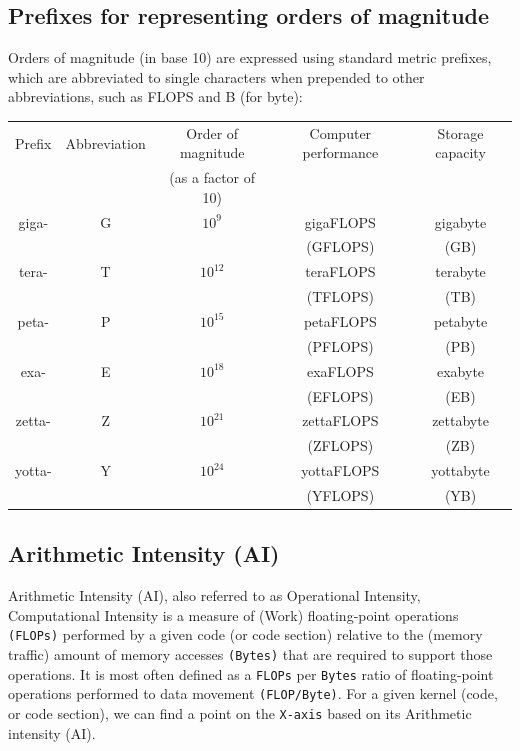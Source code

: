 \documentclass{article}
\begin{document}
\subsection{Prefixes for representing orders of magnitude}
Orders of magnitude (in base 10) are expressed using standard metric prefixes, which are abbreviated to single characters when prepended to other abbreviations, such as FLOPS and B (for byte):
\begin{table}[!htp] %
\begin{tabular}{|c|c|c|c|c|} \hline
Prefix & Abbreviation  & Order of magnitude     & Computer performance & Storage capacity \\
       &               &   (as a factor of 10)  &                      &  \\ \hline\hline
giga-  & G & $10^9$    & gigaFLOPS    & gigabyte \\
       &   &           &  (GFLOPS)    &   (GB)   \\ \hline
tera-  & T & $10^{12}$ &  teraFLOPS   & terabyte \\
       &   &           &  (TFLOPS)    &  (TB) \\ \hline
peta-  & P & $10^{15}$ & petaFLOPS    & petabyte\\
       &   &           & (PFLOPS)    & (PB) \\ \hline
exa-   & E & $10^{18}$ & exaFLOPS     & exabyte \\
       &   &           &   (EFLOPS)     & (EB) \\  \hline
zetta- & Z & $10^{21}$ & zettaFLOPS   & zettabyte \\
       &   &           & (ZFLOPS)     & (ZB) \\  \hline
yotta- & Y & $10^{24}$ & yottaFLOPS   & yottabyte \\
       &   &           & (YFLOPS)     &  (YB) \\  \hline
\end{tabular}
\end{table}
\subsection{Arithmetic Intensity (AI)}
Arithmetic Intensity (AI), also referred to as Operational Intensity, Computational Intensity is a measure of (Work) floating-point operations \verb+(FLOPs)+ performed by a given code (or code section) relative to the (memory traffic) amount of memory accesses \verb+(Bytes)+ that are required to support those operations. 
It is most often defined as a \verb+FLOPs+ per \verb+Bytes+ ratio of floating-point operations performed to data movement \verb+(FLOP/Byte)+. 
For a given kernel (code, or code section), we can find a point on the \verb+X-axis+ based on its Arithmetic intensity (AI).
\end{document}
